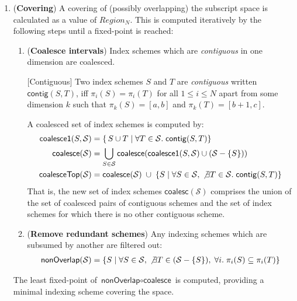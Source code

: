 \begin{enumerate}[leftmargin=1.5em]
\item (\textbf{Covering})
A covering of (possibly overlapping) the subscript space
is calculated as a value of $Region_N$. This is computed iteratively
by the following steps until a fixed-point is reached:

\begin{enumerate}[leftmargin=0.5em]
\item (\textbf{Coalesce intervals})
%
Index schemes which are \emph{contiguous} in one dimension are
coalesced.

\newcommand{\contig}[2]{\mathsf{contig}(#1, #2)}
\begin{defn}{[Contiguous]}
Two index schemes $S$ and $T$ are \emph{contiguous}
written $\contig{S}{T}$,
iff $\pi_i(S) = \pi_i(T)$
for all $1 \leq i \leq N$ apart from some dimension $k$ such that
$\pi_k(S) = [a, b]$ and $\pi_k(T) = [b+1, c]$.
\end{defn}
%
A coalesced set of index schemes is computed by:%
\begin{align*}
\mathsf{coalesce1}(S, \mathcal{S}) & =
 \{\,S \cup T \mid
\forall T \in \mathcal{S}. \;
\contig{S}{T} \} \\
\mathsf{coalesce}(\mathcal{S}) & =
\bigcup_{S \in \mathcal{S}} \mathsf{coalesce}(
\mathsf{coalesce1}(S, \mathcal{S})
\cup (\mathcal{S} - \{S\})) \\
\mathsf{coalesceTop}(\mathcal{S}) & =
 \mathsf{coalesce}(\mathcal{S})
\; \cup \;
\{ S \mid \forall S \in \mathcal{S},
\; \not \exists T \in \mathcal{S} . \; \contig{S}{T}\}
\end{align*}
%
That is, the new set of index schemes $\mathsf{coalesc}(\mathcal{S})$
comprises the union of the set of coalesced pairs of contiguous
schemes and the set of index schemes for which there is no other
contiguous scheme.
\item (\textbf{Remove redundant schemes})
Any indexing schemes which are subsumed by another are filtered out:
%
\begin{align*}
\textsf{nonOverlap}(\mathcal{S}) =
\{S \mid \forall S \in \mathcal{S}, \; \not \exists T \in (\mathcal{S} -
  \{S\}), \; \forall i . \; \pi_i(S) \subseteq \pi_i(T) \}
\end{align*}
%
\end{enumerate}
The least fixed-point of $\textsf{nonOverlap} \circ \textsf{coalesce}$
is computed, providing a minimal indexing scheme covering the space.


\end{enumerate}
